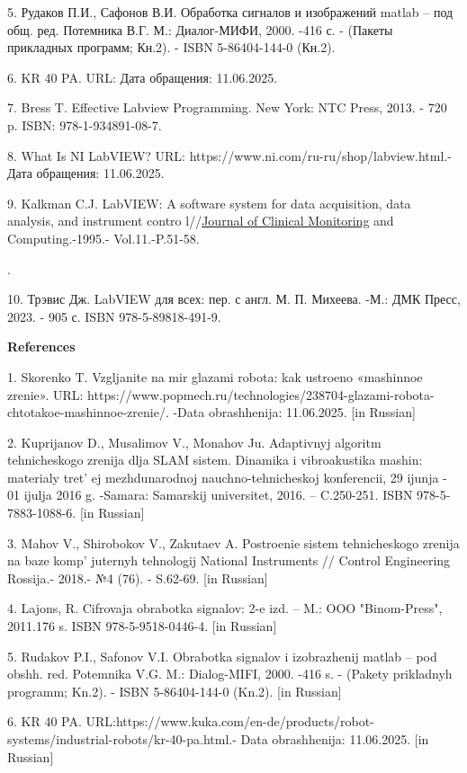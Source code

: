 5. Рудаков П.И., Сафонов В.И. Обработка сигналов и изображений matlab --
под общ. ред. Потемника В.Г. М.: Диалог-МИФИ, 2000. -416 с. - (Пакеты
прикладных программ; Кн.2). - ISBN 5-86404-144-0 (Кн.2).

6. KR 40 PA.
URL:
Дата обращения: 11.06.2025.

7. Bress T. Effective Labview Programming. New York: NTC Press, 2013. -
720 p. ISBN: 978-1-934891-08-7.

8. What Is NI LabVIEW? URL: https://www.ni.com/ru-ru/shop/labview.html.-
Дата обращения: 11.06.2025.

9. Kalkman C.J. LabVIEW: A software system for data acquisition, data
analysis, and instrument contro
l//\href{https://link.springer.com/journal/10877}{Journal of Clinical
Monitoring} and Computing.-1995.- Vol.11.-P.51-58.

.

10. Трэвис Дж. LabVIEW для всех: пер. с англ. М. П. Михеева. -М.: ДМК
Пресс, 2023. - 905 с. ISBN 978-5-89818-491-9.

{\bfseries References}

1. Skorenko T. Vzgljanite na mir glazami robota: kak ustroeno «mashinnoe
zrenie». URL:
https://www.popmech.ru/technologies/238704-glazami-robota-chtotakoe-mashinnoe-zrenie/.
-Data obrashhenija: 11.06.2025. {[}in Russian{]}

2. Kuprijanov D., Musalimov V., Monahov Ju. Adaptivnyj algoritm
tehnicheskogo zrenija dlja SLAM sistem. Dinamika i vibroakustika mashin:
materialy tret' ej mezhdunarodnoj nauchno-tehnicheskoj
konferencii, 29 ijunja - 01 ijulja 2016 g. -Samara: Samarskij
universitet, 2016. -- C.250-251. ISBN 978-5-7883-1088-6. {[}in
Russian{]}

3. Mahov V., Shirobokov V., Zakutaev A. Postroenie sistem tehnicheskogo
zrenija na baze komp' juternyh tehnologij National
Instruments // Control Engineering Rossija.- 2018.- №4 (76). - S.62-69.
{[}in Russian{]}

4. Lajons, R. Cifrovaja obrabotka signalov: 2-e izd. -- M.: OOO
"Binom-Press", 2011.176 s. ISBN 978-5-9518-0446-4. {[}in Russian{]}

5. Rudakov P.I., Safonov V.I. Obrabotka signalov i izobrazhenij matlab
-- pod obshh. red. Potemnika V.G. M.: Dialog-MIFI, 2000. -416 s. -
(Pakety prikladnyh programm; Kn.2). - ISBN 5-86404-144-0 (Kn.2). {[}in
Russian{]}

6. KR 40 PA.
URL:https://www.kuka.com/en-de/products/robot-systems/industrial-robots/kr-40-pa.html.-
Data obrashhenija: 11.06.2025. {[}in Russian{]}

